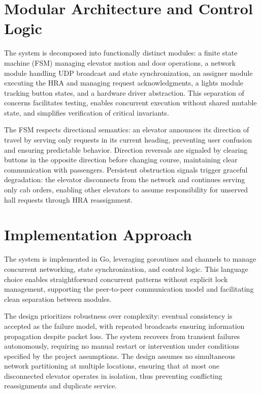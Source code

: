 \documentclass[12pt,a4paper]{article}
\begin{document}
\section*{Modular Architecture and Control Logic}

The system is decomposed into functionally distinct modules: a finite state machine (FSM) managing elevator motion and door operations, a network module handling UDP broadcast and state synchronization, an assigner module executing the HRA and managing request acknowledgments, a lights module tracking button states, and a hardware driver abstraction. This separation of concerns facilitates testing, enables concurrent execution without shared mutable state, and simplifies verification of critical invariants.

The FSM respects directional semantics: an elevator announces its direction of travel by serving only requests in its current heading, preventing user confusion and ensuring predictable behavior. Direction reversals are signaled by clearing buttons in the opposite direction before changing course, maintaining clear communication with passengers. Persistent obstruction signals trigger graceful degradation: the elevator disconnects from the network and continues serving only cab orders, enabling other elevators to assume responsibility for unserved hall requests through HRA reassignment.

\section*{Implementation Approach}

The system is implemented in Go, leveraging goroutines and channels to manage concurrent networking, state synchronization, and control logic. This language choice enables straightforward concurrent patterns without explicit lock management, supporting the peer-to-peer communication model and facilitating clean separation between modules.

The design prioritizes robustness over complexity: eventual consistency is accepted as the failure model, with repeated broadcasts ensuring information propagation despite packet loss. The system recovers from transient failures autonomously, requiring no manual restart or intervention under conditions specified by the project assumptions. The design assumes no simultaneous network partitioning at multiple locations, ensuring that at most one disconnected elevator operates in isolation, thus preventing conflicting reassignments and duplicate service.
\end{document}
